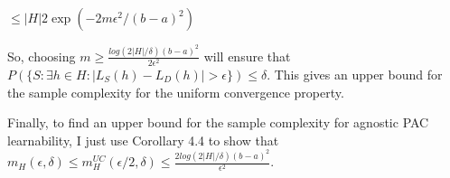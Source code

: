 \documentclass[12pt, letterpaper]{article}
\begin{document}
\hspace{50mm}
$\leq |H| 2 \exp{(-2m\epsilon^2 / (b-a)^2)}$

\vspace{5mm}
So, choosing $m\geq \frac{log(2|H|/\delta)(b-a)^2}
    {2\epsilon^2}$ will ensure that $P(\{S: \exists h\in H: |L_S(h) - L_D(h)| > \epsilon\})\leq \delta$. This gives an upper bound for the sample complexity for the uniform convergence property.

\vspace{5mm}
Finally, to find an upper bound for the sample complexity for agnostic PAC learnability, I just use Corollary 4.4 to show that $m_H(\epsilon, \delta) \leq 
    m_H^{UC}(\epsilon/2, \delta)\leq
    \frac{2log(2|H|/\delta)(b-a)^2}{\epsilon ^2}$.
    
\end{document}
